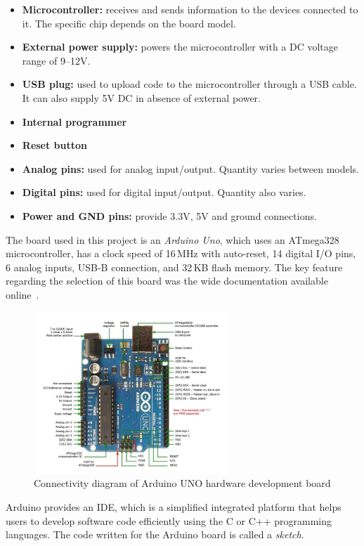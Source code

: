 \begin{itemize}
	\item \textbf{Microcontroller:} receives and sends information to the devices connected to it. The specific chip depends on the board model.
	\item \textbf{External power supply:} powers the microcontroller with a DC voltage range of 9--12V.
	\item \textbf{USB plug:} used to upload code to the microcontroller through a USB cable. It can also supply 5V DC in absence of external power.
	\item \textbf{Internal programmer}
	\item \textbf{Reset button}
	\item \textbf{Analog pins:} used for analog input/output. Quantity varies between models.
	\item \textbf{Digital pins:} used for digital input/output. Quantity also varies.
	\item \textbf{Power and GND pins:} provide 3.3V, 5V and ground connections.
\end{itemize}
The board used in this project is an \textit{Arduino Uno}, which uses an ATmega328 microcontroller, has a clock speed of 16\,MHz with auto-reset, 14 digital I/O pins, 6 analog inputs, USB-B connection, and 32\,KB flash memory.  
The key feature regarding the selection of this board was the wide documentation available online~\cite{Ref9}.

\begin{figure}[h!]
	\centering
	\includegraphics[width=0.65\textwidth]{imaxes/arduino-pinout.png}
	\caption{Connectivity diagram of Arduino UNO hardware development board}
	\label{fig:arduino}
\end{figure}

Arduino provides an IDE, which is a simplified integrated platform that helps users to develop software code efficiently using the C or C++ programming languages. The code written for the Arduino board is called a \textit{sketch}.

